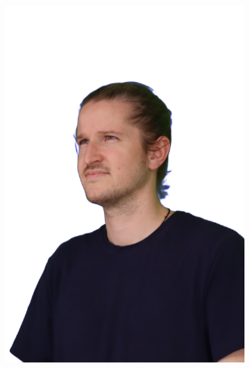 \begin{figure}
\begin{subfigure}{0.18\linewidth}
        \includegraphics[width=\textwidth]{Figures/results/splatfacto_ex/34_render.png}

\end{subfigure}
\end{figure}
